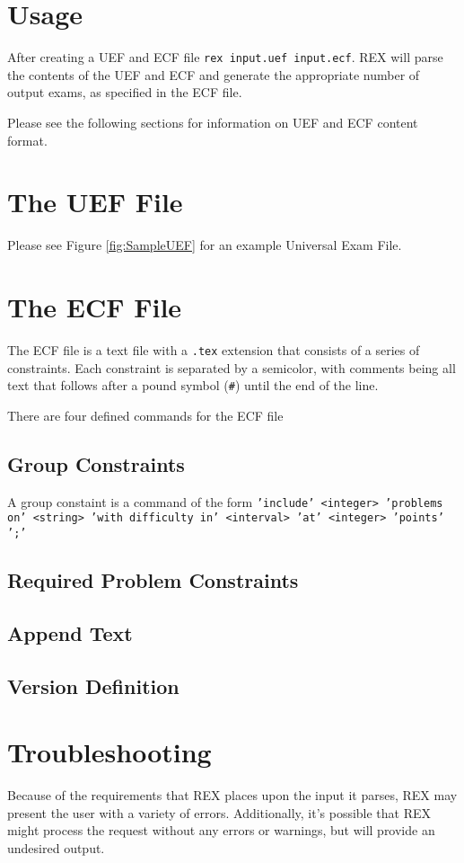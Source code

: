\documentclass{article}
\begin{document}
\section{Usage}
After creating a UEF and ECF file \texttt{rex input.uef input.ecf}. 
REX will parse the contents of the UEF and ECF and generate the appropriate number of
output exams, as specified in the ECF file.

Please see the following sections for information on UEF and ECF
content format.

\section{The UEF File}

Please see Figure \ref{fig:SampleUEF} for an example Universal Exam File.

\section{The ECF File}
The ECF file is a text file with a \texttt{.tex} extension that consists of a series of 
constraints. Each constraint is separated by a semicolor, with comments being all text
that follows after a pound symbol (\texttt{#}) until the end of the line.

There are four defined commands for the ECF file
\subsection{Group Constraints}
A group constaint is a command of the form \texttt{'include' <integer> 'problems on' <string>
'with difficulty in' <interval> 'at' <integer> 'points' ';'}

\subsection{Required Problem Constraints}

\subsection{Append Text}

\subsection{Version Definition
}

\section{Troubleshooting}
Because of the requirements that REX places upon the input it parses,
REX may present the user with a variety of errors. Additionally, it's
possible that REX might process the request without any errors or warnings,
but will provide an undesired output.
\end{document}
